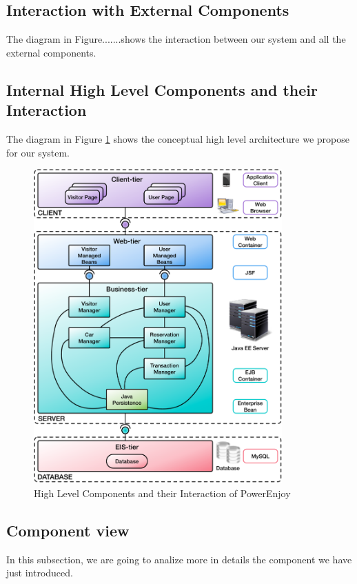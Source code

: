 \subsection{Interaction with External Components} \label{subsec:comp-extern}
The diagram in Figure.......shows the interaction between our system and all the external components.
\clearpage
\subsection{Internal High Level Components and their Interaction} \label{subsec:comp-inter}

The diagram in Figure \ref{fig:high-comp} shows the conceptual high level architecture we propose for our system.
\vspace{18pt}
\begin{figure}[htbp]
\centering
\includegraphics[width=0.85\textwidth]{Images/HighLevelComponents.pdf}
\vspace{10pt}
\caption{High Level Components and their Interaction of PowerEnjoy}
\label{fig:high-comp}
\end{figure}
\clearpage

\subsection{Component view} \label{subsec:comp-view}
In this subsection, we are going to analize more in details the component we have just introduced.

